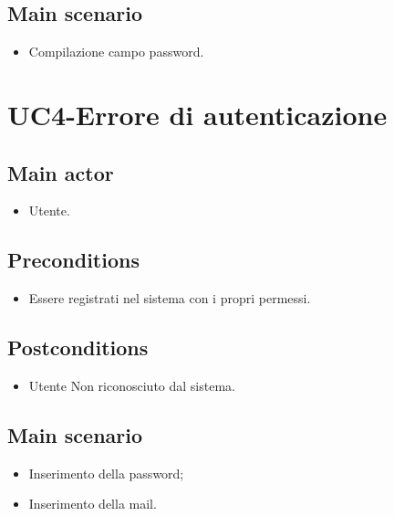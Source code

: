 \documentclass{article}
\begin{document}
         \subsection*{Main scenario}
        \begin{itemize}
        \item Compilazione campo password.
        \end{itemize}

\section{UC4-Errore di autenticazione}
    
     \subsection*{Main actor}
         \begin{itemize}
             \item Utente.
         \end{itemize}
     \subsection*{Preconditions} 
        \begin{itemize}
            \item Essere registrati nel sistema con i propri permessi.
        \end{itemize}
               
    \subsection*{Postconditions}
        \begin{itemize}
            \item Utente Non riconosciuto dal sistema.
        \end{itemize}
        \subsection*{Main scenario}
        \begin{itemize}
        \item Inserimento della password;
        \item Inserimento della mail.
        \end{itemize}

    
\end{document}

